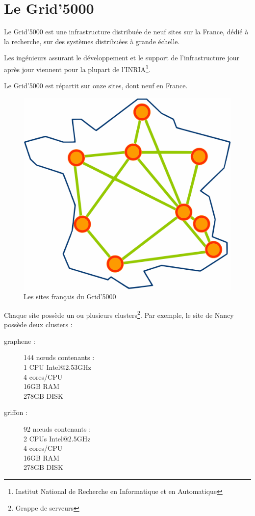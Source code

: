\documentclass[12pt]{report}
\begin{document}
                        \newpage
		\section{Le Grid'5000}
		Le Grid'5000 est une infrastructure distribuée de neuf sites sur la France, dédié à la recherche,
		sur des systèmes distribuées à grande échelle.

		Les ingénieurs assurant le développement et le support de l'infrastructure jour après jour viennent pour la plupart	de l'INRIA\footnote{Institut National de Recherche en Informatique et en Automatique}.

		Le Grid'5000 est répartit sur onze sites, dont neuf en France.

		\begin{figure}[H]
			\begin{center}
				\includegraphics[width=0.4\linewidth]{images/Site_map.png}
				\caption{Les sites français du Grid'5000}
			\end{center}
		\end{figure}

		Chaque site possède un ou plusieurs clusters\footnote{Grappe de serveurs}. Par exemple, le site de Nancy possède deux clusters :
		
		\begin{description}
			\item[graphene :] 144 nœuds contenants :\\
			1 CPU Intel@2.53GHz\\
			4 cores/CPU\\
			16GB RAM\\
			278GB DISK
			\item[griffon :] 92 nœuds contenants :\\
			2 CPUs Intel@2.5GHz\\
			4 cores/CPU\\
			16GB RAM\\
			278GB DISK
		\end{description}
                \newpage
                
\end{document}
